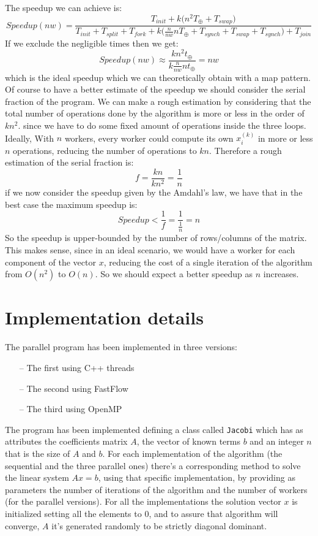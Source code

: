 \documentclass[12pt]{article}
\begin{document}
	The speedup we can achieve is:
	\[ Speedup(nw) = \frac{T_{init} + k\Big(n^2T_\oplus + T_{swap}\Big)}{T_{init} + T_{split} + T_{fork} + k\Big(\frac{n}{nw}nT_\oplus + T_{synch} + T_{swap} + T_{synch}\Big) + T_{join}}\]
	If we exclude the negligible times then we get:
	\[ Speedup(nw) \approx \frac{kn^2t_\oplus}{k\frac{n}{nw}nt_\oplus} = nw\]
	which is the ideal speedup which we can theoretically obtain with a map pattern. Of course to have a better estimate of the speedup we should consider the serial fraction of the program. We can make a rough estimation by considering that the total number of operations done by the algorithm is more or less in the order of $kn^2$. since we have to do some fixed amount of operations inside the three loops. Ideally, With $n$ workers, every worker could compute its own $x_i^{(k)}$ in more or less $n$ operations, reducing the number of operations to $kn$. Therefore a rough estimation of the serial fraction is:
	\[ f = \frac{kn}{kn^2} = \frac{1}{n}\]
	if we now consider the speedup given by the Amdahl's law, we have that in the best case the maximum speedup is:
	\[ Speedup < \frac{1}{f} = \frac{1}{\frac{1}{n}} = n\]
	So the speedup is upper-bounded by the number of rows/columns of the matrix. This makes sense, since in an ideal scenario, we would have a worker for each component of the vector $x$, reducing the cost of a single iteration of the algorithm from $O(n^2)$ to $O(n)$. So we should expect a better speedup as $n$ increases. 
	
	\section{Implementation details}
	The parallel program has been implemented in three versions:
	\begin{itemize}
		\item[--] The first using C++ threads 
		\item[--] The second using FastFlow
		\item[--] The third using OpenMP
	\end{itemize}
	The program has been implemented defining a class called \verb|Jacobi| which has as attributes the coefficients matrix $A$, the vector of known terms $b$ and an integer $n$ that is the size of $A$ and $b$. For each implementation of the algorithm (the sequential and the three parallel ones) there's a corresponding method to solve the linear system $Ax = b$, using that specific implementation, by providing as parameters the number of iterations of the algorithm and the number of workers (for the parallel versions). For all the implementations the solution vector $x$ is initialized setting all the elements to 0, and to assure that algorithm will converge, $A$ it's generated randomly to be strictly diagonal dominant. 
	
\end{document}
